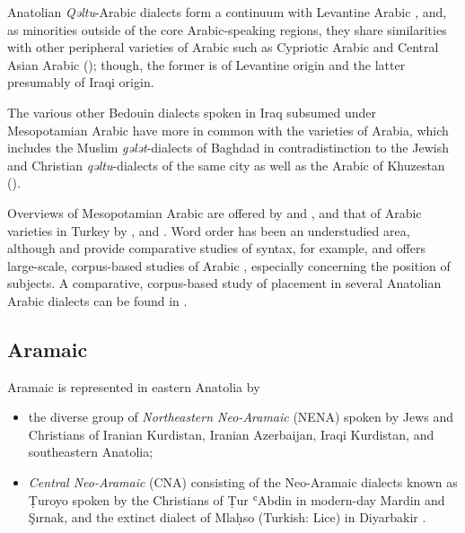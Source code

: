 \documentclass[output=paper,colorlinks,citecolor=brown,draftmode]{langscibook}
\begin{document}
Anatolian \textit{Qəltu}-Arabic dialects form a continuum with Levantine Arabic \citep{Talay2014Levantine}, and, as minorities outside of the core Arabic-speaking regions, they share similarities with other peripheral varieties of Arabic such as Cypriotic Arabic and Central Asian Arabic (\citealt{Akkus2017PArabic}); though, the former is of Levantine origin and the latter presumably of Iraqi origin.

\begin{sloppypar}
The various other Bedouin dialects spoken in Iraq subsumed under Mesopotamian Arabic have more in common with the varieties of Arabia, which includes the Muslim \textit{gələt}-dialects of Baghdad in contradistinction to the Jewish and Christian \textit{qəltu}-dialects of the same city \citep{Blanc1964CDBaghdad} as well as the Arabic of Khuzestan ().
\end{sloppypar}

Overviews of Mesopotamian Arabic are offered by \citet{Jastrow1978MAqetlu1} and \citep{Talay2012AMesopotamia}, and that of Arabic varieties in Turkey by \citet{Jastrow2006ATurkey}, \citet{Arnold2015CTA} and \citet{prochazka2019}. Word order has been an understudied area, although \citet[131–141]{Jastrow1978MAqetlu1} and \citet[204--218]{Birnstiel2022CopulaKA} provide comparative studies of  syntax, for example, and \citet{Dahlgren1998WOA} offers large-scale, corpus-based studies of Arabic , especially concerning the position of subjects. A comparative, corpus-based study of  placement in several Anatolian Arabic dialects can be found in \citet{Noorlander2024OVArabi}.

\subsection{Aramaic}

Aramaic is represented in eastern Anatolia by 

\begin{itemize}
    \item the diverse group of \textit{Northeastern Neo-Aramaic} (NENA) spoken by Jews and Christians of Iranian Kurdistan, Iranian Azerbaijan, Iraqi Kurdistan, and southeastern Anatolia; 
    \item \textit{Central Neo-Aramaic} (CNA) consisting of the Neo-Aramaic dialects known as Ṭuroyo spoken by the Christians of Ṭur ʿAbdin in modern-day Mardin and Şırnak, and the extinct dialect of Mlaḥso (Turkish: Lice) in Diyarbakir \citep{Jastrow1994Mlahso}.
\end{itemize}
\end{document}
